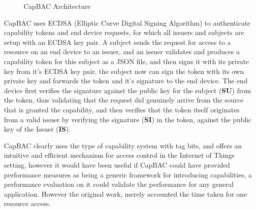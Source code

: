\begin{figure}[h]
\centering
\caption{CapBAC Architecture }
\label{fig:capbac}
\end{figure}

CapBAC uses ECDSA (Elliptic Curve Digital Signing Algorithm) to authenticate capability tokens and end device requests, for which all issuers and subjects are setup with an ECDSA key pair. A subject sends the request for access to a resource on an end device to an issuer, and an issuer validates and produces a capability token for this subject as a JSON file, and then signs it with its private key from it's ECDSA key pair, the subject now can sign the token with its own private key and forwards the token and it's signature to the end device. The end device first verifies the signature against the public key for the subject (\textbf{SU}) from the token, thus validating that the request did genuinely arrive from the source that is granted the capability, and then verifies that the token itself originates from a valid issuer by verifying the signature (\textbf{SI}) in the token, against the public key of the Issuer (\textbf{IS}).

CapBAC clearly uses the type of capability system with tag bits, and offers an intuitive and efficient mechanism for access control in the Internet of Things setting, however it would have been useful if CapBAC could have provided performance measures as being a generic framework for introducing capabilities, a performance evaluation on it could validate the performance for any general application.  However the original work, merely accounted the time taken for one resource access.

